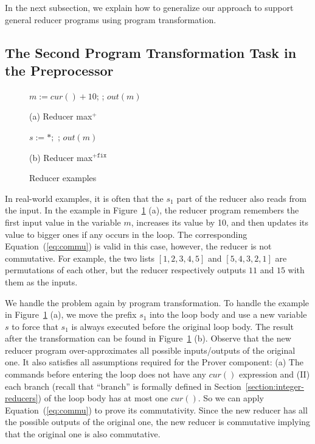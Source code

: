 \documentclass{llncs}
\newcommand{\cur}{cur()}
\begin{document}
In the next subsection, we explain how to generalize our approach to support general reducer programs using program transformation.

\subsection{The Second Program Transformation Task in the Preprocessor}
\label{sec:program_trans2}


\begin{figure}[t]
	\begin{minipage}{0.4\textwidth}
		\begin{algorithm}[H]
			\;\;$m := \cur + 10$; \;
			\Loop{}{
				$t:=\cur$\;
				\uIf{ $t> m$}{
					$m := t$ \;
				}
			};
			$out(m)$\;\;
		\end{algorithm}
		\caption*{(a) Reducer max$^+$}
	\end{minipage}
		\begin{minipage}{0.6\textwidth}
			\begin{algorithm}[H]
				$s:=*;$\;
				\Loop{}{
					\uIf{$s=1$}{$m := \cur + 10; s:= 2$}
					\uElse{
						$t:=\cur$\;
						\uIf{ $t > m$}{
							$m := t$ \;
						}
					}
				};
				$out(m)$
			\end{algorithm}
			\caption*{(b) Reducer max$^{+\mathtt{fix}}$}
		\end{minipage}
	\caption{Reducer examples}
	\label{fig:reducer_max}
\end{figure}





In real-world examples, it is often that the $s_1$ part of the reducer also reads from the input. In the example in Figure~\ref{fig:reducer_max} (a), the reducer program remembers the first input value in the variable $m$, increases its value by 10, and then updates its value to bigger ones if any occurs in the loop. The corresponding Equation~(\ref{eq:commu}) is valid in this case, however, the reducer is not commutative. For example, the two lists $[1,2,3,4,5]$ and $[5,4,3,2,1]$ are permutations of each other, but the reducer respectively outputs $11$ and $15$ with them as the inputs.

We handle the problem again by program transformation. To handle the example in Figure~\ref{fig:reducer_max} (a), we move the prefix $s_1$ into the loop body and use a new variable $s$ to force that $s_1$ is always executed before the original loop body. The result after the transformation can be found in Figure~\ref{fig:reducer_max} (b). Observe that the new reducer program over-approximates all possible inputs/outputs of the original one.
It also satisfies all assumptions required for the Prover component: (a) The commands before entering the loop does not have any $\cur$ expression and (II) each branch (recall that ``branch'' is formally defined in Section~\ref{section:integer-reducers}) of the loop body has at most one $\cur$. So we can apply Equation~(\ref{eq:commu}) to prove its commutativity.
Since the new reducer has all the possible outputs of the original one, the new reducer is commutative implying that the original one is also commutative.
\end{document}
